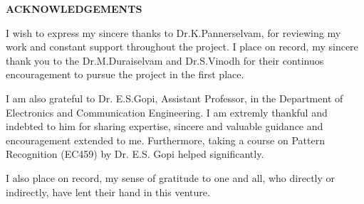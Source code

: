 \thispagestyle{plain}
\begin{center}
\textbf{\textbf{\fontsize{16pt}{24pt}\selectfont ACKNOWLEDGEMENTS}}
\end{center}

I wish to express my sincere thanks to Dr.K.Pannerselvam, for reviewing my work and constant support throughout the project.
I place on record, my sincere thank you to the Dr.M.Duraiselvam and Dr.S.Vinodh for their continuos encouragement to pursue the project in the first place.

I am also grateful to Dr. E.S.Gopi, Assistant Professor, in the Department of Electronics and Communication Engineering. I am extremly thankful and indebted to him for sharing expertise, sincere and valuable guidance and encouragement extended to me. Furthermore, taking a course on Pattern Recognition (EC459) by Dr. E.S. Gopi helped significantly.

I also place on record, my sense of gratitude to one and all, who directly or indirectly, have lent their hand in this venture.

\newpage
